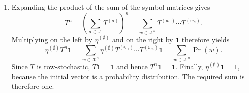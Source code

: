 \begin{solution}[ex:p3-1]
\begin{enumerate}
\begin{enumerate}
            The word $010$ would require the path to emit a $0$ immediately
            after the transition $A\xrightarrow{1}B$, but state $B$ cannot
            emit $0$. Hence there is no such path. Equivalently,
            \[
              \eta^{(\emptyset)}T^{(0)}T^{(1)}T^{(0)}
                =\begin{bmatrix}0&0\end{bmatrix},
              \qquad
              \Pr(010)=0.
            \]
            This is the shortest example of an odd run of $1$s occurring
            between two $0$s, which the Even Process forbids.
        \end{enumerate}

      \item Expanding the product of the sum of the symbol matrices gives
        \[
          T^n
            =\left(\sum_{a\in\mathcal X}T^{(a)}\right)^n
            =\sum_{w\in\mathcal X^n}T^{(w_1)}\cdots T^{(w_n)}.
        \]
        Multiplying on the left by $\eta^{(\emptyset)}$ and on the right by
        $\mathbf 1$ therefore yields
        \[
          \eta^{(\emptyset)}T^n\mathbf 1
            =\sum_{w\in\mathcal X^n}
              \eta^{(\emptyset)}T^{(w_1)}\cdots T^{(w_n)}\mathbf 1
            =\sum_{w\in\mathcal X^n}\Pr(w).
        \]
        Since $T$ is row-stochastic, $T\mathbf 1=\mathbf 1$ and hence
        $T^n\mathbf 1=\mathbf 1$. Finally,
        $\eta^{(\emptyset)}\mathbf 1=1$, because the initial vector is a
        probability distribution. The required sum is therefore one.
    \end{enumerate}
\end{solution}

